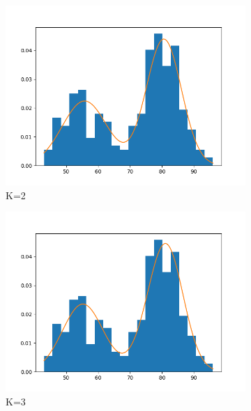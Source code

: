 \begin{figure}
     \centering
     \begin{subfigure}[b]{0.3\textwidth}
         \centering
         \includegraphics[width=\textwidth]{../code/q2/data_hist_k2.png}
         \caption{K=2}
         \label{fig:k=2}
     \end{subfigure}
     \hfill
     \begin{subfigure}[b]{0.3\textwidth}
         \centering
         \includegraphics[width=\textwidth]{../code/q2/data_hist_k3.png}
         \caption{K=3}
         \label{fig:k=3}
     \end{subfigure}
     \hfill
     \hfill
     \begin{subfigure}[b]{0.3\textwidth}

\end{subfigure}
\end{figure}
